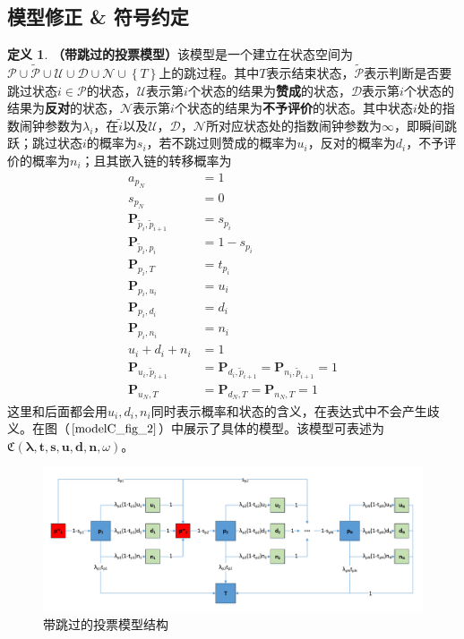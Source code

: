 \documentclass[UTF8]{ctexart}
\theoremstyle{plain}
\theoremstyle{definition}
\newtheorem{defn}{定义}[section]
\theoremstyle{remark}
\begin{document}
	\subsection{模型修正 \& 符号约定}
	\begin{defn}\textbf{（带跳过的投票模型）}该模型是一个建立在状态空间为$\mathcal{P} \cup \mathcal{\tilde{P}} \cup \mathcal{U} \cup \mathcal{D} \cup \mathcal{N} \cup \left\{T\right\}$上的跳过程。其中$T$表示结束状态，$\mathcal{\tilde{P}}$表示判断是否要跳过状态$i \in \mathcal{P}$的状态，$\mathcal{U}$表示第$i$个状态的结果为\textbf{赞成}的状态，$\mathcal{D}$表示第$i$个状态的结果为\textbf{反对}的状态，$\mathcal{N}$表示第$i$个状态的结果为\textbf{不予评价}的状态。其中状态$i$处的指数闹钟参数为$\lambda_i$，在$\tilde{i}$以及$\mathcal{U}$，$\mathcal{D}$，$\mathcal{N}$所对应状态处的指数闹钟参数为$\infty$，即瞬间跳跃；跳过状态$i$的概率为$s_i$，若不跳过则赞成的概率为$u_i$，反对的概率为$d_i$，不予评价的概率为$n_i$；且其嵌入链的转移概率为
	\begin{equation}
	\begin{aligned}
	a_{p_N} & = 1 \\
	s_{p_N} & = 0 \\
	\bm{P}_{\tilde{p}_i, \tilde{p}_{i+1}} & = s_{p_i} \\
	\bm{P}_{\tilde{p}_i, p_i} & = 1 - s_{p_i} \\
	\bm{P}_{p_i,T}  & = t_{p_i} \\
	\bm{P}_{p_i,u_i} & = u_i \\
	\bm{P}_{p_i,d_i} & = d_i \\
	\bm{P}_{p_i,n_i} & = n_i \\
	u_i + d_i + n_i & = 1\\
	\bm{P}_{u_i, \tilde{p}_{i+1}} & = \bm{P}_{d_i, \tilde{p}_{i+1}} = \bm{P}_{n_i, \tilde{p}_{i+1}} = 1 \\
	\bm{P}_{u_N, T} & = \bm{P}_{d_N, T} = \bm{P}_{n_N, T} = 1
	\end{aligned}
	\end{equation}
	这里和后面都会用$u_i,d_i,n_i$同时表示概率和状态的含义，在表达式中不会产生歧义。在图（$\ref{modelC_fig_2}$）中展示了具体的模型。该模型可表述为$\mathfrak{C}\left(\bm{\lambda}, \bm{t}, \bm{s}, \bm{u}, \bm{d}, \bm{n},\omega\right)$。
	\end{defn}
	\begin{figure}[H] 
		\centering
		\includegraphics[width = 12cm]{modelC_fig_2.pdf}
		\caption{带跳过的投票模型结构}\label{modelC_fig_2}
	\end{figure}
	
\end{document}
